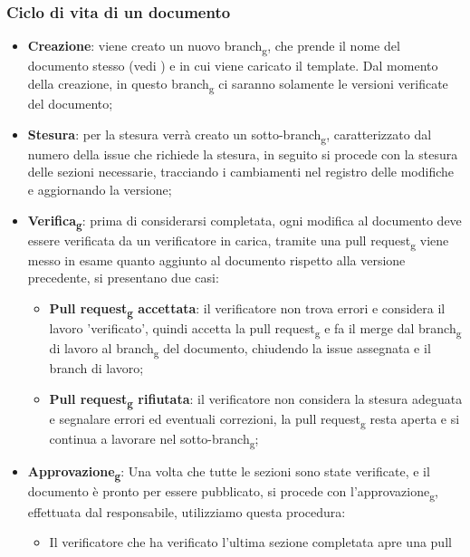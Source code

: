 \subsubsection{Ciclo di vita di un documento}
\begin{itemize}
    \item \textbf{Creazione}: viene creato un nuovo branch\textsubscript{g}, che prende il nome del documento stesso
          (vedi ) e in cui viene caricato il template. Dal momento della creazione, in questo
          branch\textsubscript{g} ci saranno solamente le versioni verificate del documento;
    \item \textbf{Stesura}: per la stesura verrà creato un sotto-branch\textsubscript{g}, caratterizzato dal numero della issue che richiede la stesura, in seguito si procede con la stesura delle sezioni necessarie, tracciando i cambiamenti nel registro delle modifiche e aggiornando la versione;
    \item \textbf{Verifica\textsubscript{g}}: prima di considerarsi completata, ogni modifica al documento deve essere verificata da un verificatore in carica, tramite una pull request\textsubscript{g} viene messo in esame quanto aggiunto al documento rispetto alla versione precedente, si presentano due casi:
          \begin{itemize}
              \item \textbf{Pull request\textsubscript{g} accettata}: il verificatore non trova errori e considera il lavoro 'verificato', quindi accetta la pull request\textsubscript{g} e fa il merge dal branch\textsubscript{g} di lavoro al branch\textsubscript{g} del documento, chiudendo la issue assegnata e il branch di lavoro;
              \item \textbf{Pull request\textsubscript{g} rifiutata}: il verificatore non considera la stesura adeguata e segnalare errori ed eventuali correzioni, la pull request\textsubscript{g} resta aperta e si continua a lavorare nel sotto-branch\textsubscript{g};
          \end{itemize}
    \item \textbf{Approvazione\textsubscript{g}}: Una volta che tutte le sezioni sono state verificate, e il documento è pronto per essere pubblicato, si procede con l'approvazione\textsubscript{g}, effettuata dal responsabile, utilizziamo questa procedura:
          \begin{itemize}
              \item Il verificatore che ha verificato l'ultima sezione completata apre una pull

\end{itemize}
\end{itemize}
